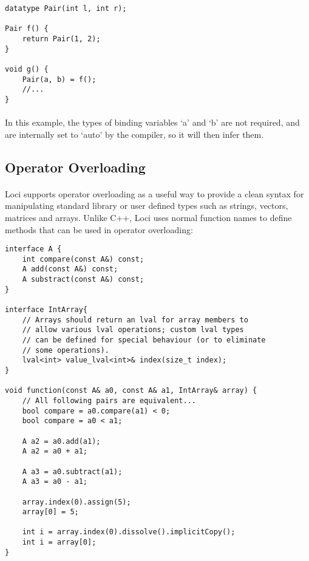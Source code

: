 \documentclass[12pt,twoside,notitlepage]{report}
\begin{document}
\begin{lstlisting}
datatype Pair(int l, int r);

Pair f() {
	return Pair(1, 2);
}

void g() {
	Pair(a, b) = f();
	//...
}
\end{lstlisting}

\paragraph{}
In this example, the types of binding variables `a' and `b' are not required, and are internally set to `auto' by the compiler, so it will then infer them.

\clearpage

\subsection{Operator Overloading}

\paragraph{}
Loci supports operator overloading as a useful way to provide a clean syntax for manipulating standard library or user defined types such as strings, vectors, matrices and arrays. Unlike C++, Loci uses normal function names to define methods that can be used in operator overloading:

\begin{lstlisting}
interface A {
	int compare(const A&) const;
	A add(const A&) const;
	A substract(const A&) const;
}

interface IntArray{
	// Arrays should return an lval for array members to
	// allow various lval operations; custom lval types
	// can be defined for special behaviour (or to eliminate
	// some operations).
	lval<int> value_lval<int>& index(size_t index);
}

void function(const A& a0, const A& a1, IntArray& array) {
	// All following pairs are equivalent...
	bool compare = a0.compare(a1) < 0;
	bool compare = a0 < a1;
	
	A a2 = a0.add(a1);
	A a2 = a0 + a1;
	
	A a3 = a0.subtract(a1);
	A a3 = a0 - a1;
	
	array.index(0).assign(5);
	array[0] = 5;
	
	int i = array.index(0).dissolve().implicitCopy();
	int i = array[0];
}
\end{lstlisting}
\end{document}
